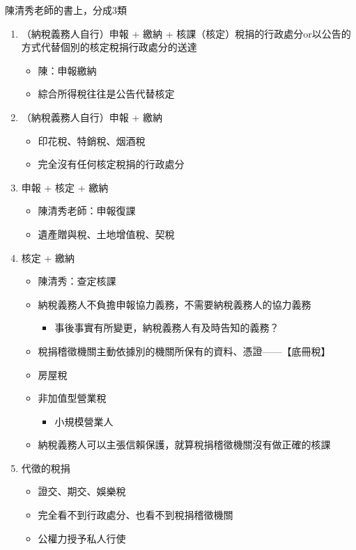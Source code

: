 \documentclass[]{ctexbook}
\providecommand{\tightlist}{%
  \setlength{\itemsep}{0pt}\setlength{\parskip}{0pt}}
\begin{document}
陳清秀老師的書上，分成3類

\begin{enumerate}
\def\labelenumi{\arabic{enumi}.}
\tightlist
\item
  （納稅義務人自行）申報 + 繳納 + 核課（核定）稅捐的行政處分or以公告的方式代替個別的核定稅捐行政處分的送達

  \begin{itemize}
  \tightlist
  \item
    陳：申報繳納
  \item
    綜合所得稅往往是公告代替核定
  \end{itemize}
\item
  （納稅義務人自行）申報 + 繳納

  \begin{itemize}
  \tightlist
  \item
    印花稅、特銷稅、烟酒稅
  \item
    完全沒有任何核定稅捐的行政處分
  \end{itemize}
\item
  申報 + 核定 + 繳納

  \begin{itemize}
  \tightlist
  \item
    陳清秀老師：申報復課
  \item
    遺產贈與稅、土地增值稅、契稅
  \end{itemize}
\item
  核定 + 繳納

  \begin{itemize}
  \tightlist
  \item
    陳清秀：查定核課\\
  \item
    納稅義務人不負擔申報協力義務，不需要納稅義務人的協力義務

    \begin{itemize}
    \tightlist
    \item
      事後事實有所變更，納稅義務人有及時告知的義務？
    \end{itemize}
  \item
    稅捐稽徵機關主動依據別的機關所保有的資料、憑證------【底冊稅】
  \item
    房屋稅
  \item
    非加值型營業稅

    \begin{itemize}
    \tightlist
    \item
      小規模營業人
    \end{itemize}
  \item
    納稅義務人可以主張信賴保護，就算稅捐稽徵機關沒有做正確的核課
  \end{itemize}
\item
  代徵的稅捐

  \begin{itemize}
  \tightlist
  \item
    證交、期交、娛樂稅
  \item
    完全看不到行政處分、也看不到稅捐稽徵機關
  \item
    公權力授予私人行使
  \end{itemize}
\end{enumerate}
\end{document}
